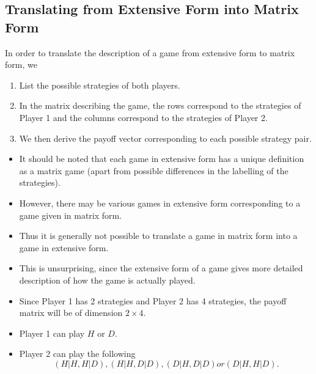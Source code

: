 \documentclass[]{report}
\begin{document}
\subsection{Translating from Extensive Form into Matrix Form}
In order to translate the description of a game from extensive form
to matrix form, we
\begin{enumerate}
\item  List the possible strategies of both players.
\item In the matrix describing the game, the rows
correspond to the strategies of Player 1 and the
columns correspond to the strategies of Player 2.
\item We then derive the payoff vector corresponding to
each possible strategy pair.
\end{enumerate}
\begin{itemize}
	\item It should be noted that each game in extensive form has a unique
	definition as a matrix game (apart from possible differences in the
	labelling of the strategies).
\item However, there may be various games in extensive form
	corresponding to a game given in matrix form. 
\item Thus it is generally
	not possible to translate a game in matrix form into a game in
	extensive form.
\item This is unsurprising, since the extensive form of a game gives more
	detailed description of how the game is actually played.
\end{itemize}


\begin{itemize}
	\item Since Player 1 has 2 strategies and Player 2 has 4 strategies, the
	payoff matrix will be of dimension $2 \times 4$.
	\item Player 1 can play $H$ or $D$.
	\item 	Player 2 can play the following \[(H|H, H|D), (H|H, D|D), (D|H, D|D) or
	(D|H, H|D). \]
\end{itemize}
\end{document}
